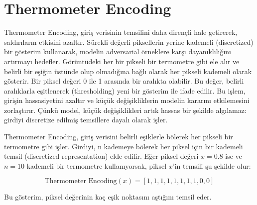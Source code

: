 \section{Thermometer Encoding}

Thermometer Encoding, giriş verisinin temsilini daha dirençli hale getirerek, saldırıların etkisini azaltır. Sürekli değerli piksellerin yerine kademeli (discretized) bir gösterim kullanarak, modelin adversarial örneklere karşı dayanıklılığını artırmayı hedefler. Görüntüdeki her bir pikseli bir termometre gibi ele alır ve belirli bir eşiğin üstünde olup olmadığına bağlı olarak her pikseli kademeli olarak gösterir. Bir piksel değeri 0 ile 1 arasında bir aralıkta olabilir. Bu değer, belirli aralıklarla eşitlenerek (thresholding) yeni bir gösterim ile ifade edilir. Bu işlem, girişin hassasiyetini azaltır ve küçük değişikliklerin modelin kararını etkilemesini zorlaştırır. Çünkü model, küçük değişiklikleri artık hassas bir şekilde algılamaz: girdiyi discretize edilmiş temsillere dayalı olarak işler. 

Thermometer Encoding, giriş verisini belirli eşiklerle bölerek her pikseli bir termometre gibi işler. Girdiyi, n kademeye bölerek her piksel için bir kademeli temsil (discretized representation) elde edilir. Eğer piksel değeri $x = 0.8$ ise ve $n = 10$ kademeli bir termometre kullanıyorsak, piksel $x$'in temsili şu şekilde olur:

\[ \text{Thermometer Encoding}(x) = [1, 1, 1, 1, 1, 1, 1, 1, 0, 0] \]

Bu gösterim, piksel değerinin kaç eşik noktasını aştığını temsil eder.

\newpage